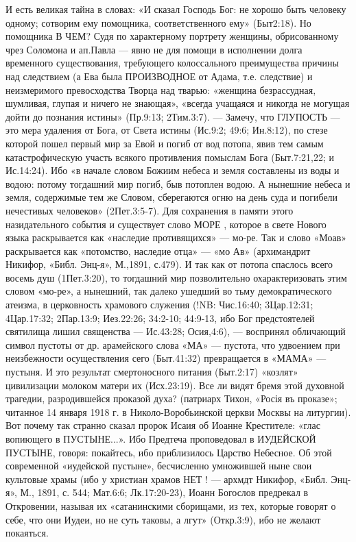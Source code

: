      И есть великая тайна в словах:  «И сказал Господь Бог: не хорошо быть человеку одному;  сотворим ему помощника, соответственного ему» (Быт2:18). Но помощника В ЧЕМ?  Судя по характерному портрету женщины, обрисованному чрез Соломона и ап.Павла --- явно не для помощи в исполнении долга временного существования, требующего колоссального преимущества причины над следствием (а Ева была ПРОИЗВОДНОЕ от Адама, т.е. следствие) и неизмеримого превосходства Творца над тварью: «женщина безрассудная, шумливая, глупая и ничего не знающая», «всегда учащаяся и никогда не могущая дойти до познания истины» (Пр.9:13; 2Тим.3:7). --- Замечу, что ГЛУПОСТЬ --- это мера удаления от Бога, от Света истины (Ис.9:2; 49:6; Ин.8:12), по стезе которой пошел первый мир за Евой и погиб от вод потопа, явив тем самым катастрофическую участь всякого противления помыслам Бога (Быт.7:21,22; и Ис.14:24).  Ибо «в начале словом Божиим небеса и земля составлены из воды и водою: потому тогдашний мир погиб, быв потоплен водою. А нынешние небеса и земля, содержимые тем же Словом, сберегаются огню на день суда и погибели нечестивых человеков» (2Пет.3:5-7).
     Для сохранения в памяти этого назидательного события и существует слово МОРЕ , которое в свете Нового языка раскрывается как «наследие противящихся» --- мо-ре. Так и слово «Моав» раскрывается как «потомство, наследие отца» --- «мо Ав» (архимандрит Никифор, «Библ. Энц-я», М.,1891, с.479). И так как от потопа спаслось всего восемь душ (1Пет.3:20), то тогдашний мир позволительно охарактеризовать этим словом «мо-ре», а нынешний, так далеко ушедший во тьму демократического атеизма, в церковность храмового служения (!NB:  Чис.16:40; 3Цар.12:31; 4Цар.17:32; 2Пар.13:9; Иез.22:26; 34:2-10; 44:9-13, ибо Бог предстоятелей святилища лишил священства --- Ис.43:28; Осия,4:6), --- воспринял обличающий символ пустоты от др. арамейского слова «МА» --- пустота, что удвоением при неизбежности осуществления сего (Быт.41:32) превращается в «МАМА» --- пустыня. И это результат смертоносного питания (Быт.2:17) «козлят» цивилизации молоком матери их (Исх.23:19). Все ли видят бремя этой духовной трагедии, разродившейся проказой духа? (патриарх Тихон, «Росія въ проказе»; читанное 14 января 1918 г. в Николо-Воробьинской церкви Москвы на литургии).
     Вот почему так странно сказал пророк Исаия об Иоанне Крестителе: «глас вопиющего в ПУСТЫНЕ...». Ибо Предтеча проповедовал в ИУДЕЙСКОЙ ПУСТЫНЕ, говоря: покайтесь, ибо приблизилось Царство Небесное. Об этой современной «иудейской пустыне», бесчисленно умножившей ныне свои культовые храмы (ибо у христиан храмов НЕТ ! --- архмдт Никифор, «Библ. Энц-я», М., 1891, с. 544; Мат.6:6; Лк.17:20-23), Иоанн Богослов предрекал в Откровении, называя их «сатанинскими сборищами, из тех, которые говорят о себе, что они Иудеи, но не суть таковы, а лгут» (Откр.3:9), ибо не желают покаяться.

